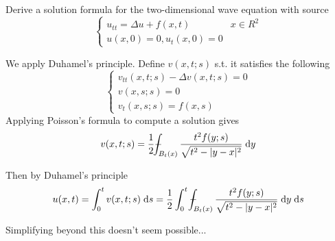 Derive a solution formula for the two-dimensional wave equation with source
$$
\begin{cases}
  u_{tt} = \Delta u + f(x, t) & x \in R^2\\
  u(x, 0) = 0, u_t(x, 0) = 0
\end{cases}
$$

We apply Duhamel's principle.
Define $v(x, t; s)$ s.t. it satisfies the following
$$
\begin{cases}
  v_{tt}(x, t; s) - \Delta v(x, t; s) = 0\\
  v(x, s; s) = 0\\
  v_t(x, s; s) = f(x, s)
\end{cases}
$$
Applying Poisson's formula to compute a solution gives
$$
v(x, t; s) =\frac{1}{2} \avgint_{B_t(x)} \frac{t^2 f(y; s)}{\sqrt{t^2 - |y - x|^2}} \dy
$$

Then by Duhamel's principle
$$
u(x, t) = \int_0^t v(x, t; s) \ds = \frac{1}{2} \int_0^t \avgint_{B_t(x)} \frac{t^2 f(y; s)}{\sqrt{t^2 - |y - x|^2}} \dy \ds
$$

Simplifying beyond this doesn't seem possible...
